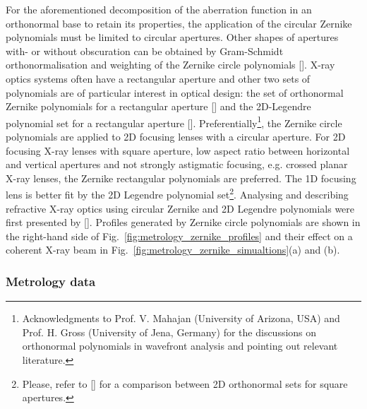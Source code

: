 \begin{refsection}
For the aforementioned decomposition of the aberration function in an orthonormal base to retain its properties, the application of the circular Zernike polynomials must be limited to circular apertures. Other shapes of apertures with- or without obscuration can be obtained by Gram-Schmidt orthonormalisation and weighting of the Zernike circle polynomials [\cite{Swantner1994,Mahajan1995}]. X-ray optics systems often have a rectangular aperture and other two sets of polynomials are of particular interest in optical design: the set of orthonormal Zernike polynomials for a rectangular aperture  [\cite{Mahajan2007}] and the 2D-Legendre polynomial set for a rectangular aperture [\cite{Mahajan2010}]. Preferentially\footnote{Acknowledgments to Prof. V. Mahajan (University of Arizona, USA) and Prof. H. Gross (University of Jena, Germany) for the discussions on orthonormal polynomials in wavefront analysis and pointing out relevant literature.}, the Zernike circle polynomials are applied to 2D focusing lenses with a circular aperture. For 2D focusing X-ray lenses with square aperture, low aspect ratio between horizontal and vertical apertures and not strongly astigmatic focusing, e.g. crossed planar X-ray lenses, the Zernike rectangular polynomials are preferred. The 1D focusing lens is better fit by the 2D Legendre polynomial set\footnote{Please, refer to [\cite{Ye2014}] for a comparison between 2D orthonormal sets for square apertures.}. Analysing and describing refractive X-ray optics using circular Zernike and 2D Legendre polynomials were first presented by [\cite{Koch2016}]. Profiles generated by Zernike circle polynomials are shown in the right-hand side of Fig.~\ref{fig:metrology_zernike_profiles} and their effect on a coherent X-ray beam in Fig.~\ref{fig:metrology_zernike_simualtions}(a) and (b).

\newpage
\subsubsection*{Metrology data}


\end{refsection}

